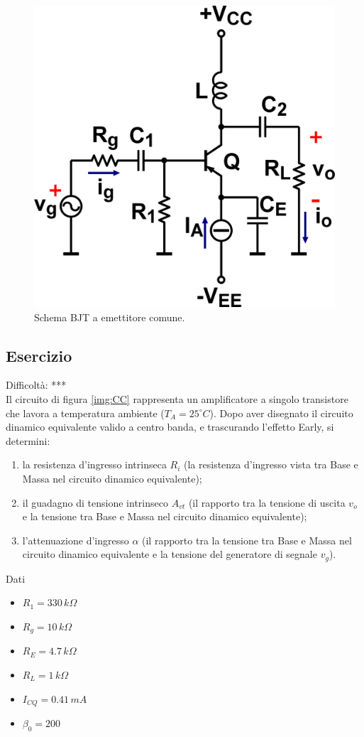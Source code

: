 \documentclass[a4paper,portrait,12pt]{article}
\theoremstyle{definition}
\begin{document}
\begin{figure}[H]
\centering
\includegraphics[width=.5\linewidth]{img/elettronicaEs/EC.pdf}
\caption{Schema BJT a emettitore comune.}
\label{img:EC}
\end{figure}


\subsection{Esercizio}

Difficoltà: ***\\

Il circuito di figura \ref{img:CC} rappresenta un amplificatore a singolo transistore che lavora a 
temperatura ambiente ($T_A = 25^{\circ}C$). Dopo aver disegnato il circuito dinamico equivalente valido a 
centro banda, e trascurando l'effetto Early, si determini:
\begin{enumerate}
\item la resistenza d'ingresso intrinseca $R_i$ (la resistenza d'ingresso vista tra Base e Massa nel circuito 
	dinamico equivalente);
\item il guadagno di tensione intrinseco $A_{vt}$ (il rapporto tra la tensione di uscita $v_o$ e la tensione 
	tra Base e Massa nel circuito dinamico equivalente);
\item l'attenuazione d'ingresso $\alpha$ (il rapporto tra la tensione tra Base e Massa nel circuito dinamico 
	equivalente e la tensione del generatore di segnale $v_g$).
\end{enumerate}

Dati
\begin{itemize}
\item $R_1=330\,k\Omega$ 
\item $R_g=10\,k\Omega$
\item $R_E=4.7\,k\Omega$
\item $R_L=1\,k\Omega$
\item $I_{CQ}=0.41\,mA$
\item $\beta_0=200$
\end{itemize}
\end{document}
